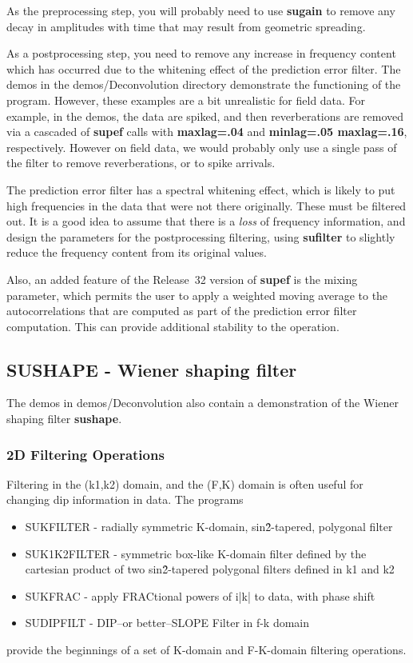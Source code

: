 {{{{{{{As the preprocessing step, you will probably need to use {\bf sugain\/}
to remove any decay in amplitudes with time that may result from geometric
spreading. 

As a postprocessing step, you need to remove any increase in frequency
content which has occurred due to the whitening effect of the 
prediction error filter. The demos in the demos/Deconvolution  directory
demonstrate the functioning of the program. However, these examples
are a bit unrealistic for field data. For example, in the demos, the
data are spiked, and then reverberations are removed via a cascaded
of {\bf supef\/} calls with {\bf maxlag=.04\/} and 
{\bf minlag=.05 maxlag=.16\/}, respectively. However on field data,
we would probably only use a single pass of the filter to remove
reverberations, or to spike arrivals.

The prediction error filter has a spectral whitening effect, which
is likely to put high frequencies in the data that were not there
originally. These must be filtered out. It is a good idea to assume
that there is a {\em loss\/} of frequency information, and design
the parameters for the postprocessing filtering, using {\bf sufilter\/}
to slightly reduce the frequency content from its original values.

Also, an added feature of the Release~32 version of {\bf supef\/}
is the mixing parameter, which permits the user to apply a weighted
moving average to the autocorrelations that are computed as part of
the prediction error filter computation. This can provide additional
stability to the operation.

\subsection{SUSHAPE - Wiener shaping filter}

The demos in demos/Deconvolution also contain a demonstration of
the Wiener shaping filter {\bf sushape\/}.


\subsubsection{2D Filtering Operations}
Filtering in the (k1,k2) domain, and the (F,K) domain is
often useful for changing dip information in data. 
The programs
\begin{itemize}
\item SUKFILTER - radially symmetric K-domain, sin\^2-tapered, polygonal filter 
\item SUK1K2FILTER - symmetric box-like K-domain filter defined by the
cartesian product of two sin\^2-tapered polygonal filters defined in k1 and k2
\item SUKFRAC - apply FRACtional powers of i|k| to data, with phase shift 
\item SUDIPFILT - DIP--or better--SLOPE Filter in f-k domain
\end{itemize}
provide the beginnings of a set of K-domain and F-K-domain filtering
operations.

}}}}}}}
